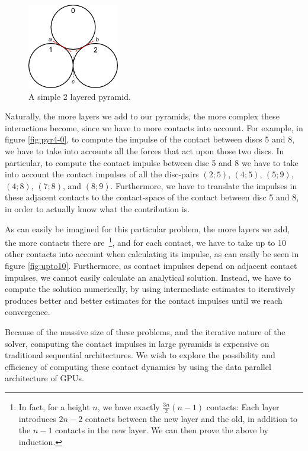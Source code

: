 \documentclass[runningheads,a4paper]{llncs}
\begin{document}
\begin{figure}
  \centering
  \includegraphics{figures/pyr2simple.png}
  \caption{A simple 2 layered pyramid.}
  \label{pyr2simple}
\end{figure}

Naturally, the more layers we add to our pyramids, the more complex these
interactions become, since we have to more contacts into account. For example,
in figure \ref{fig:pyr4-0}, to compute the impulse of the contact between discs
5 and 8, we have to take into accounts all the forces that act upon those two
discs. In particular, to compute the contact impulse between disc 5 and 8 we
have to take into account the contact impulses of all the disc-pairs $(2;5)$,
$(4;5)$, $(5;9)$, $(4;8)$, $(7;8)$, and $(8;9)$. Furthermore, we have to
translate the impulses in these adjacent contacts to the contact-space of the
contact between disc 5 and 8, in order to actually know what the contribution
is.

As can easily be imagined for this particular problem, the more layers we add,
the more contacts there are~\footnote{In fact, for a height $n$, we have
  exactly $\frac{3n}{2}(n-1)$ contacts: Each layer introduces $2n-2$ contacts
  between the new layer and the old, in addition to the $n-1$ contacts in the
  new layer. We can then prove the above by induction.}, and for each contact,
we have to take up to 10 other contacts into account when calculating its
impulse, as can easily be seen in figure \ref{fig:upto10}. Furthermore, as
contact impulses depend on adjacent contact impulses, we cannot easily
calculate an analytical solution. Instead, we have to compute the solution
numerically, by using intermediate estimates to iteratively produces better and
better estimates for the contact impulses until we reach convergence.

Because of the massive size of these problems, and the iterative nature of the
solver, computing the contact impulses in large pyramids is expensive on
traditional sequential architectures. We wish to explore the possibility and
efficiency of computing these contact dynamics by using the data parallel
architecture of GPUs.
\end{document}
